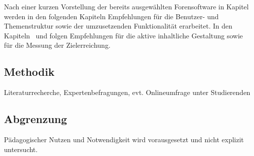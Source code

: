 Nach einer kurzen Vorstellung der bereits ausgewählten Forensoftware in Kapitel~ werden in den folgenden Kapiteln Empfehlungen für die Benutzer- und Themenstruktur sowie der umzusetzenden Funktionalität erarbeitet. In den Kapiteln~ und  folgen Empfehlungen für die aktive inhaltliche Gestaltung sowie für die Messung der Zielerreichung.

\subsection{Methodik} %
\label{sub:methodik}
Literaturrecherche, Expertenbefragungen, evt. Onlineumfrage unter Studierenden

\subsection{Abgrenzung} %
\label{sub:abgrenzung}
Pädagogischer Nutzen und Notwendigkeit wird vorausgesetzt und nicht explizit untersucht.


